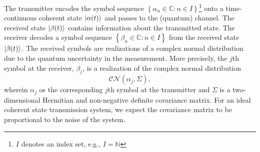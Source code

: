 The transmitter encodes the symbol sequence $\left\{\alpha_n\in\mathbb{C}\colon n\in I\right\}$\footnote{$I$ denotes an index set, e.g., $I=\mathbb{N}$} onto a time-continuous coherent state $\lvert\alpha(t)\rangle$ and passes to the (quantum) channel.
The received state $\lvert\beta(t)\rangle$ contains information about the transmitted state.
The receiver decodes a symbol sequence $\left\{\beta_n\in\mathbb{C}\colon n\in I\right\}$ from the received state $\lvert\beta(t)\rangle$.
The received symbols are realizations of a complex normal distribution due to the quantum uncertainty in the measurement.
More precisely, the $j$th symbol at the receiver, $\beta_j$, is a realization of the complex normal distribution
\begin{equation*}
	\mathcal{CN}\left(
		\alpha_j,
		\Sigma
	\right),
\end{equation*}
wherein $\alpha_j$ os the corresponding $j$th symbol at the transmitter and $\Sigma$ is a two-dimensional Hermitian and non-negative definite covariance matrix.
For an ideal coherent state transmission system, we expect the covariance matrix to be proportional to the noise of the system.